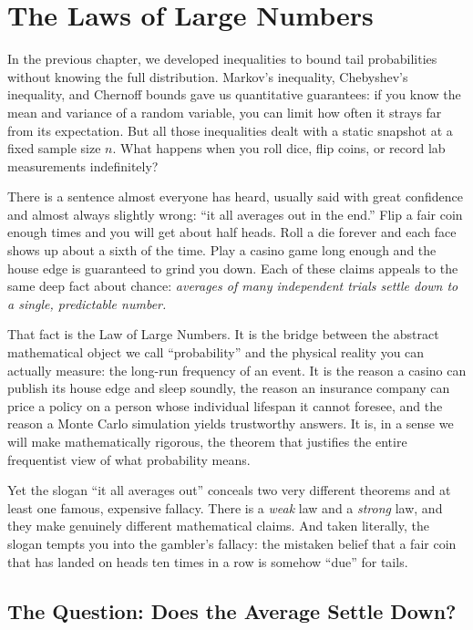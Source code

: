 \chapter{The Laws of Large Numbers}

In the previous chapter, we developed inequalities to bound tail probabilities without knowing the full distribution. Markov's inequality, Chebyshev's inequality, and Chernoff bounds gave us quantitative guarantees: if you know the mean and variance of a random variable, you can limit how often it strays far from its expectation. But all those inequalities dealt with a static snapshot at a fixed sample size $n$. What happens when you roll dice, flip coins, or record lab measurements indefinitely?

There is a sentence almost everyone has heard, usually said with great confidence and almost always slightly wrong: ``it all averages out in the end.'' Flip a fair coin enough times and you will get about half heads. Roll a die forever and each face shows up about a sixth of the time. Play a casino game long enough and the house edge is guaranteed to grind you down. Each of these claims appeals to the same deep fact about chance: \emph{averages of many independent trials settle down to a single, predictable number.}

That fact is the Law of Large Numbers. It is the bridge between the abstract mathematical object we call ``probability'' and the physical reality you can actually measure: the long-run frequency of an event. It is the reason a casino can publish its house edge and sleep soundly, the reason an insurance company can price a policy on a person whose individual lifespan it cannot foresee, and the reason a Monte Carlo simulation yields trustworthy answers. It is, in a sense we will make mathematically rigorous, the theorem that justifies the entire frequentist view of what probability means.

Yet the slogan ``it all averages out'' conceals two very different theorems and at least one famous, expensive fallacy. There is a \emph{weak} law and a \emph{strong} law, and they make genuinely different mathematical claims. And taken literally, the slogan tempts you into the gambler's fallacy: the mistaken belief that a fair coin that has landed on heads ten times in a row is somehow ``due'' for tails.

\chapterline

\section{The Question: Does the Average Settle Down?}
\label{ch20:question}

